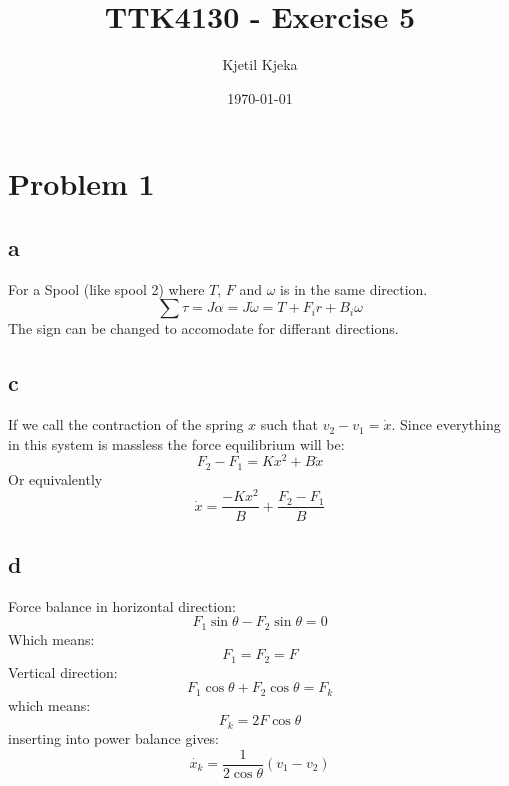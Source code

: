 \documentclass[11pt]{article}
\author{Kjetil Kjeka}
\title{TTK4130 - Exercise 5}
\date{\today}
\begin{document}
\maketitle
\section*{Problem 1}
\subsection*{a}
For a Spool (like spool 2) where $T$, $F$ and $\omega$ is in the same direction.
\[\sum \tau = J \alpha = J \dot{\omega} = T + F_i r + B_i \omega \]
The sign can be changed to accomodate for differant directions.

\subsection*{c}
If we call the contraction of the spring $x$ such that $v_2 - v_1 = \dot{x}$. Since everything in this system is massless the force equilibrium will be:
\[ F_2 - F_1 = K x^2 + B \dot{x} \]
Or equivalently
\[ \dot{x} = \frac{-K x^2}{B} + \frac{F_2 - F_1}{B} \]

\subsection*{d}
Force balance in horizontal direction:
\[F_1 \sin{\theta} - F_2 \sin{\theta} = 0\]
Which means:
\[F_1 = F_2 = F \]
Vertical direction:
\[ F_1 \cos{\theta} + F_2 \cos{\theta} = F_k \]
which means:
\[ F_k = 2 F \cos{\theta} \]
inserting into power balance gives:
\[\dot{x_k} = \frac{1}{2 \cos{\theta}} (v_1 - v_2)\]
\end{document}
